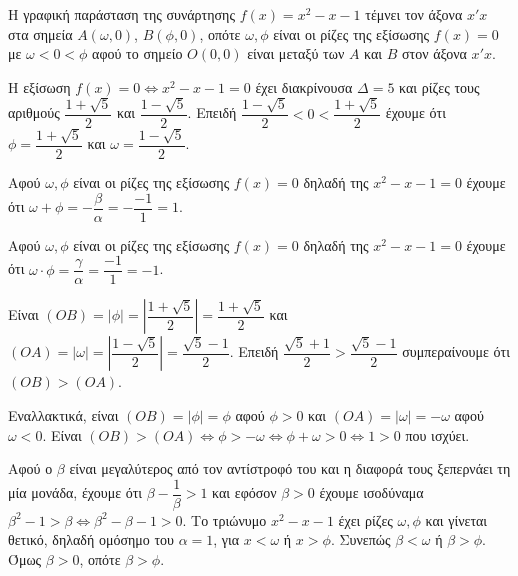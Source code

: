 
\begin{alist}
\item Η γραφική παράσταση της συνάρτησης $f(x) = x^2 - x - 1$ τέμνει τον άξονα $x'x$
στα σημεία $A(\omega, 0)$, $B(\phi, 0)$, οπότε $\omega, \phi$ είναι οι ρίζες της εξίσωσης $f(x) = 0$ με
$\omega < 0 < \phi$ αφού το σημείο $O(0, 0)$ είναι μεταξύ των $A$ και $B$ στον άξονα $x'x$.

Η εξίσωση $f(x) = 0 \Leftrightarrow x^2 - x - 1 = 0$ έχει διακρίνουσα $\Delta = 5$ και ρίζες τους
αριθμούς $\dfrac{1 + \sqrt{5}}{2}$ και $\dfrac{1 - \sqrt{5}}{2}$. Επειδή $\dfrac{1 - \sqrt{5}}{2} < 0 < \dfrac{1 + \sqrt{5}}{2}$ έχουμε ότι $\phi = \dfrac{1 + \sqrt{5}}{2}$ και $\omega = \dfrac{1 - \sqrt{5}}{2}$.

\begin{rlist}
\item Αφού $\omega, \phi$ είναι οι ρίζες της εξίσωσης $f(x) = 0$ δηλαδή της $x^2 - x - 1 = 0$
έχουμε ότι $\omega + \phi = -\dfrac{\beta}{\alpha} = -\dfrac{-1}{1} = 1$.

\item Αφού $\omega, \phi$ είναι οι ρίζες της εξίσωσης $f(x) = 0$ δηλαδή της $x^2 - x - 1 = 0$
έχουμε ότι $\omega \cdot \phi = \dfrac{\gamma}{\alpha} = \dfrac{-1}{1} = -1$.
\end{rlist}

\item Είναι $(OB) = |\phi| = \left|\dfrac{1 + \sqrt{5}}{2}\right| = \dfrac{1 + \sqrt{5}}{2}$ και $(OA) = |\omega| = \left|\dfrac{1 - \sqrt{5}}{2}\right| = \dfrac{\sqrt{5} - 1}{2}$.
Επειδή $\dfrac{\sqrt{5} + 1}{2} > \dfrac{\sqrt{5} - 1}{2}$ συμπεραίνουμε ότι $(OB) > (OA)$.

Εναλλακτικά, είναι $(OB) = |\phi| = \phi$ αφού $\phi > 0$ και $(OA) = |\omega| = -\omega$ αφού $\omega < 0$.
Είναι $(OB) > (OA) \Leftrightarrow \phi > -\omega \Leftrightarrow \phi + \omega > 0 \Leftrightarrow 1 > 0$ που ισχύει.

\item Αφού ο $\beta$ είναι μεγαλύτερος από τον αντίστροφό του και η διαφορά τους
ξεπερνάει τη μία μονάδα, έχουμε ότι $\beta - \dfrac{1}{\beta} > 1$ και εφόσον $\beta > 0$ έχουμε ισοδύναμα
$\beta^2 - 1 > \beta \Leftrightarrow \beta^2 - \beta - 1 > 0$. Το τριώνυμο $x^2 - x - 1$ έχει ρίζες $\omega, \phi$ και
γίνεται θετικό, δηλαδή ομόσημο του $\alpha = 1$, για $x < \omega$ ή $x > \phi$. Συνεπώς $\beta < \omega$ ή $\beta > \phi$. Όμως $\beta > 0$, οπότε $\beta > \phi$.


\end{alist}
